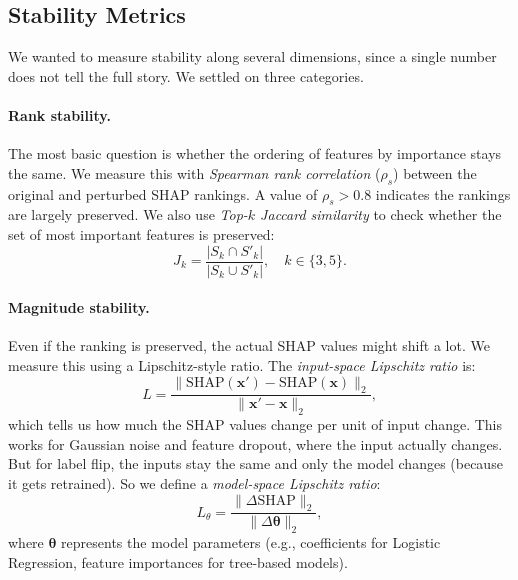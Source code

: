 \documentclass[10pt,twocolumn]{article}
\begin{document}
\subsection{Stability Metrics}\label{sec:metrics}

We wanted to measure stability along several dimensions, since a
single number does not tell the full story. We settled on three
categories.

\paragraph{Rank stability.}
The most basic question is whether the ordering of features by
importance stays the same. We measure this with \emph{Spearman rank
correlation} ($\rho_s$) between the original and perturbed SHAP
rankings. A value of $\rho_s > 0.8$ indicates the rankings are
largely preserved. We also use \emph{Top-$k$ Jaccard similarity}
to check whether the set of most important features is preserved:
\begin{equation}\label{eq:jaccard}
  J_k = \frac{|S_k \cap S'_k|}{|S_k \cup S'_k|}, \quad k \in \{3,5\}.
\end{equation}

\paragraph{Magnitude stability.}
Even if the ranking is preserved, the actual SHAP values might shift
a lot. We measure this using a Lipschitz-style ratio. The
\emph{input-space Lipschitz ratio} is:
\begin{equation}\label{eq:lipschitz}
  L = \frac{\|\mathrm{SHAP}(\mathbf{x}') - \mathrm{SHAP}(\mathbf{x})\|_2}
           {\|\mathbf{x}' - \mathbf{x}\|_2},
\end{equation}
which tells us how much the SHAP values change per unit of input
change. This works for Gaussian noise and feature dropout, where
the input actually changes. But for label flip, the inputs stay the
same and only the model changes (because it gets retrained). So we
define a \emph{model-space Lipschitz ratio}:
\begin{equation}\label{eq:model_lipschitz}
  L_\theta = \frac{\|\Delta\mathrm{SHAP}\|_2}
                   {\|\Delta\boldsymbol\theta\|_2},
\end{equation}
where $\boldsymbol\theta$ represents the model parameters (e.g.,
coefficients for Logistic Regression, feature importances for
tree-based models).
\end{document}
